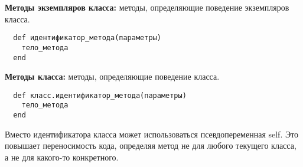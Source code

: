 \textbf{Методы экземпляров класса:} методы, определяющие поведение экземпляров класса.
\begin{verbatim}
  def идентификатор_метода(параметры)
    тело_метода
  end
\end{verbatim}

\textbf{Методы класса:} методы, определяющие поведение класса.
\begin{verbatim}
  def класс.идентификатор_метода(параметры)
    тело_метода
  end
\end{verbatim}

\begin{note}
  Вместо идентификатора класса может использоваться псевдопеременная self. Это повышает переносимость кода, определяя метод не для любого текущего класса, а не для какого-то конкретного.
\end{note}

